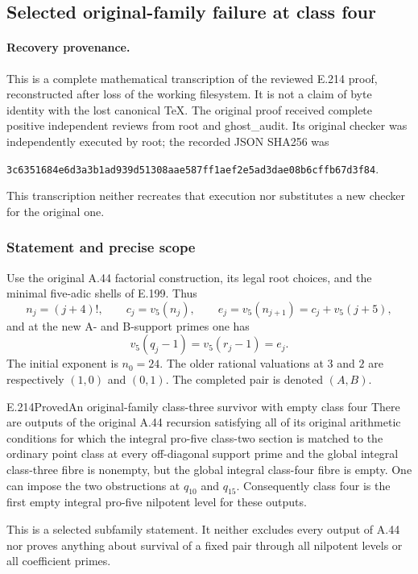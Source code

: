 \subsection{Selected original-family failure at class four}

\paragraph{Recovery provenance.}
This is a complete mathematical transcription of the reviewed E.214 proof, reconstructed after loss of the working filesystem. It is not a claim of byte identity with the lost canonical TeX. The original proof received complete positive independent reviews from root and ghost\_audit. Its original checker was independently executed by root; the recorded JSON SHA256 was
\begin{center}\texttt{3c6351684e6d3a3b1ad939d51308aae587ff1aef2e5ad3dae08b6cffb67d3f84}.\end{center}
This transcription neither recreates that execution nor substitutes a new checker for the original one.

\subsubsection*{Statement and precise scope}
Use the original A.44 factorial construction, its legal root choices, and the minimal five-adic shells of E.199. Thus
\[
 n_j=(j+4)!,\qquad c_j=v_5(n_j),\qquad
 e_j=v_5(n_{j+1})=c_j+v_5(j+5),
\]
and at the new A- and B-support primes one has
\[
 v_5(q_j-1)=v_5(r_j-1)=e_j.
\]
The initial exponent is $n_0=24$. The older rational valuations at $3$ and $2$ are respectively $(1,0)$ and $(0,1)$. The completed pair is denoted $(A,B)$.

\begin{result}{E.214}{Proved}{An original-family class-three survivor with empty class four}
There are outputs of the original A.44 recursion satisfying all of its original arithmetic conditions for which the integral pro-five class-two section is matched to the ordinary point class at every off-diagonal support prime and the global integral class-three fibre is nonempty, but the global integral class-four fibre is empty. One can impose the two obstructions at $q_{10}$ and $q_{15}$. Consequently class four is the first empty integral pro-five nilpotent level for these outputs.

This is a selected subfamily statement. It neither excludes every output of A.44 nor proves anything about survival of a fixed pair through all nilpotent levels or all coefficient primes.
\end{result}

